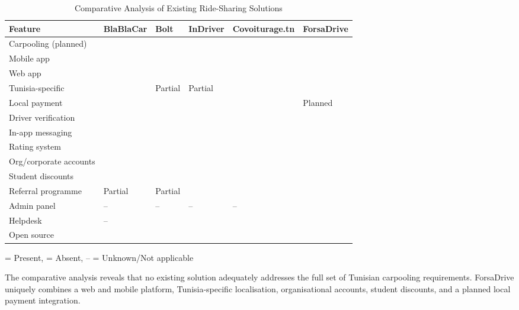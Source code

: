 \documentclass[12pt,a4paper,openright]{report}
\begin{document}
\begin{table}[H]
\centering
\caption{Comparative Analysis of Existing Ride-Sharing Solutions}
\label{tab:comparison}
\renewcommand{\arraystretch}{1.3}
\begin{tabularx}{\textwidth}{l C{1.5cm} C{1.5cm} C{1.5cm} C{1.5cm} C{1.5cm}}
\toprule
\textbf{Feature} & \textbf{BlaBlaCar} & \textbf{Bolt} & \textbf{InDriver} & \textbf{Covoiturage.tn} & \textbf{ForsaDrive} \\
\midrule
Carpooling (planned) &  &  &  &  &  \\
Mobile app &  &  &  &  &  \\
Web app &  &  &  &  &  \\
Tunisia-specific &  & Partial & Partial &  &  \\
Local payment &  &  &  &  & Planned \\
Driver verification &  &  &  &  &  \\
In-app messaging &  &  &  &  &  \\
Rating system &  &  &  &  &  \\
Org/corporate accounts &  &  &  &  &  \\
Student discounts &  &  &  &  &  \\
Referral programme & Partial & Partial &  &  &  \\
Admin panel & -- & -- & -- & -- &  \\
Helpdesk & -- &  &  &  &  \\
Open source &  &  &  &  &  \\
\bottomrule
\end{tabularx}
\footnotesize {} = Present,  = Absent, -- = Unknown/Not applicable
\end{table}

\noindent The comparative analysis reveals that no existing solution adequately addresses the full set of Tunisian carpooling requirements. ForsaDrive uniquely combines a web and mobile platform, Tunisia-specific localisation, organisational accounts, student discounts, and a planned local payment integration.
\end{document}
